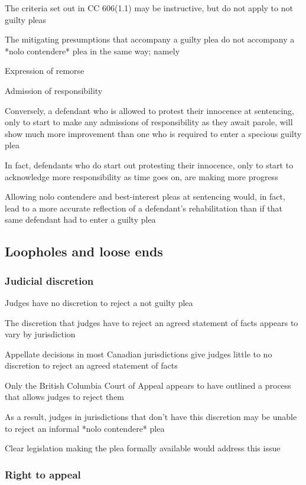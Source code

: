 The criteria set out in CC 606(1.1) may be instructive, but do not apply to not guilty pleas

The mitigating presumptions that accompany a guilty plea do not accompany a *nolo contendere* plea in the same way; namely

Expression of remorse

Admission of responsibility

Conversely, a defendant who is allowed to protest their innocence at sentencing, only to start to make any admissions of responsibility as they await parole, will show much more improvement than one who is required to enter a specious guilty plea

In fact, defendants who do start out protesting their innocence, only to start to acknowledge more responsibility as time goes on, are making more progress

Allowing nolo contendere and best-interest pleas at sentencing would, in fact, lead to a more accurate reflection of a defendant's rehabilitation than if that same defendant had to enter a guilty plea

\subsection{Loopholes and loose ends}

\subsubsection{Judicial discretion}

Judges have no discretion to reject a not guilty plea

The discretion that judges have to reject an agreed statement of facts appears to vary by jurisdiction

Appellate decisions in most Canadian jurisdictions give judges little to no discretion to reject an agreed statement of facts

Only the British Columbia Court of Appeal appears to have outlined a process that allows judges to reject them

As a result, judges in jurisdictions that don't have this discretion may be unable to reject an informal *nolo contendere* plea

Clear legislation making the plea formally available would address this issue

\subsubsection{Right to appeal}

